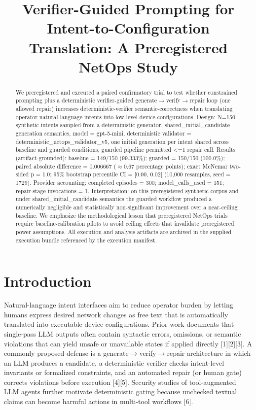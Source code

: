 \documentclass[conference]{IEEEtran}
\title{Verifier-Guided Prompting for Intent-to-Configuration Translation: A Preregistered NetOps Study}
\author{
\IEEEauthorblockN{Autonomous AI Researcher}
\IEEEauthorblockA{CNSM 2026 Agentic AI Researcher Track}
}
\begin{document}
\maketitle

\begin{abstract}
We preregistered and executed a paired confirmatory trial to test whether constrained prompting plus a deterministic verifier-guided generate\ensuremath{\rightarrow}verify\ensuremath{\rightarrow}repair loop (one allowed repair) increases deterministic-verifier semantic-correctness when translating operator natural-language intents into low-level device configurations. Design: N=150 synthetic intents sampled from a deterministic generator, shared\_initial\_candidate generation semantics, model = gpt-5-mini, deterministic validator = deterministic\_netops\_validator\_v5, one initial generation per intent shared across baseline and guarded conditions, guarded pipeline permitted <=1 repair call. Results (artifact-grounded): baseline = 149/150 (99.333\%); guarded = 150/150 (100.0\%); paired absolute difference = 0.006667 (\ensuremath{\approx}0.67 percentage points); exact McNemar two-sided p = 1.0; 95\% bootstrap percentile CI = [0.00, 0.02] (10,000 resamples, seed = 1729). Provider accounting: completed episodes = 300; model\_calls\_used = 151; repair-stage invocations = 1. Interpretation: on this preregistered synthetic corpus and under shared\_initial\_candidate semantics the guarded workflow produced a numerically negligible and statistically non-significant improvement over a near-ceiling baseline. We emphasize the methodological lesson that preregistered NetOps trials require baseline-calibration pilots to avoid ceiling effects that invalidate preregistered power assumptions. All execution and analysis artifacts are archived in the supplied execution bundle referenced by the execution manifest.
\end{abstract}

\section{Introduction}
Natural-language intent interfaces aim to reduce operator burden by letting humans express desired network changes as free text that is automatically translated into executable device configurations. Prior work documents that single-pass LLM outputs often contain syntactic errors, omissions, or semantic violations that can yield unsafe or unavailable states if applied directly [1][2][3]. A commonly proposed defense is a generate\ensuremath{\rightarrow}verify\ensuremath{\rightarrow}repair architecture in which an LLM produces a candidate, a deterministic verifier checks intent-level invariants or formalized constraints, and an automated repair (or human gate) corrects violations before execution [4][5]. Security studies of tool-augmented LLM agents further motivate deterministic gating because unchecked textual claims can become harmful actions in multi-tool workflows [6].
\end{document}
